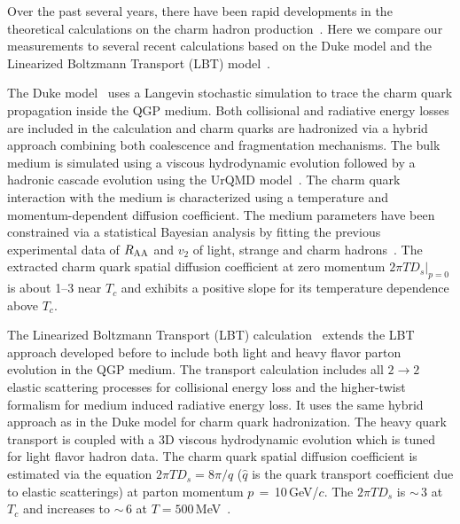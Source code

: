 \documentclass[%
 reprint,	
showpacs,
 amsmath,amssymb,
 aps,
 prc,
]{revtex4-1}
\providecommand{\DIFaddtex}[1]{{\protect\color{blue}\uwave{#1}}} %
\providecommand{\DIFdeltex}[1]{{\protect\color{red}\sout{#1}}}                      %
\providecommand{\DIFaddbegin}{} %
\providecommand{\DIFaddend}{} %
\providecommand{\DIFdelbegin}{} %
\providecommand{\DIFdelend}{} %
\providecommand{\DIFadd}[1]{\texorpdfstring{\DIFaddtex{#1}}{#1}} %
\providecommand{\DIFdel}[1]{\texorpdfstring{\DIFdeltex{#1}}{}} %
\begin{document}
Over the past several years, there have been rapid developments in the theoretical calculations on the charm hadron production~\cite{Rapp:2018qla,Cao:2018ews}. Here we compare our measurements to several recent calculations based on the Duke model and the Linearized Boltzmann Transport (LBT) model~\cite{Cao:2016gvr,LBT:private,Xu:2017obm}.

The Duke model~\cite{Duke,Xu:2017obm} uses a Langevin stochastic simulation to trace the charm quark propagation inside the QGP medium. Both collisional and radiative energy losses are included in the calculation and charm quarks are hadronized via a hybrid approach combining both coalescence and fragmentation mechanisms. The bulk medium is simulated using a viscous hydrodynamic evolution followed by a hadronic cascade evolution using the UrQMD model~\cite{urQMD}. The charm quark interaction with the medium is characterized using a temperature and momentum-dependent diffusion coefficient. The medium parameters have been constrained via a statistical Bayesian analysis by fitting the previous experimental data of $R_{\rm AA}$ and $v_{2}$ of light, strange and charm hadrons~\cite{Xu:2017obm}. The extracted charm quark spatial diffusion coefficient at zero momentum $2\pi TD_s|_{p=0}$ is about 1--3 near $T_{c}$ and exhibits a positive slope for its temperature dependence above $T_{c}$.

The Linearized Boltzmann Transport (LBT) calculation~\cite{Cao:2016gvr} extends the LBT approach developed before to include both light and heavy flavor parton evolution in the QGP medium. The transport calculation includes all $2\rightarrow 2$ elastic scattering processes for collisional energy loss and the higher-twist formalism for medium induced radiative energy loss. It uses the same hybrid approach as in the Duke model for charm quark hadronization. The heavy quark transport is coupled with a 3D viscous hydrodynamic evolution which is tuned for light flavor hadron data. The charm quark spatial diffusion coefficient is estimated via the equation $2\pi TD_s =8\pi/\hat{q}$ ($\hat{q}$ is the quark transport coefficient due to elastic scatterings) at parton momentum $p$\,$=$\,10\,GeV/$c$. The $2\pi TD_s$ is \DIFdelbegin \DIFdel{$\sim$}\DIFdelend \DIFaddbegin \DIFadd{$\approx$}\DIFaddend \,3 at $T_{c}$ and increases to \DIFdelbegin \DIFdel{$\sim$}\DIFdelend \DIFaddbegin \DIFadd{$\approx$}\DIFaddend \,6 at $T = 500$\,MeV~\cite{LBT:private}.
\end{document}
